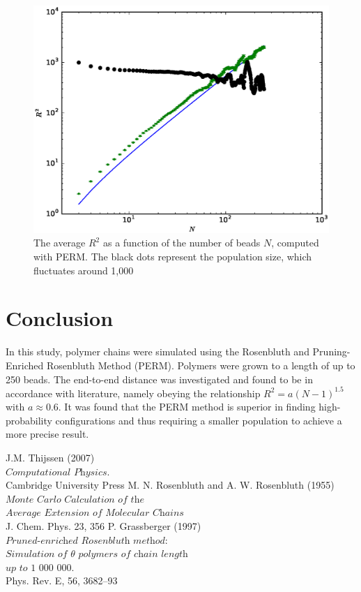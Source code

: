 \documentclass[a4paper,twocolumn]{article}
\begin{document}
\begin{figure}
	\centering
	\includegraphics[width=\linewidth]{r2_perm_1000run.eps}
	\caption{The average $R^2$ as a function of the number of beads $N$, computed with PERM. The black dots represent the population size, which fluctuates around 1,000}
	\label{fig:r2_perm}
\end{figure}

\section{Conclusion}

In this study, polymer chains were simulated using the Rosenbluth and Pruning-Enriched Rosenbluth Method (PERM). Polymers were grown to a length of up to 250 beads. The end-to-end distance was investigated and found to be in accordance with literature, namely obeying the relationship $R^2 = a(N-1)^{1.5}$ with $a \approx 0.6$. It was found that the PERM method is superior in finding high-probability configurations and thus requiring a smaller population to achieve a more precise result.

\begin{thebibliography}{9}
	J.M. Thijssen (2007)\\
	$\textit{Computational Physics}$.\\
	Cambridge University Press
	M. N. Rosenbluth and A. W. Rosenbluth (1955)\\
	$\textit{Monte Carlo Calculation of the} $ \\ $\textit{Average Extension of Molecular Chains}$\\
	J. Chem. Phys. 23, 356
	P. Grassberger (1997)\\
	$\textit{Pruned-enriched Rosenbluth method:} $ \\ $\textit{Simulation of $\theta$ polymers of chain length}$ \\ $\textit{up to 1 000 000}$.\\
	Phys. Rev. E, 56, 3682–93
\end{thebibliography}
\end{document}
